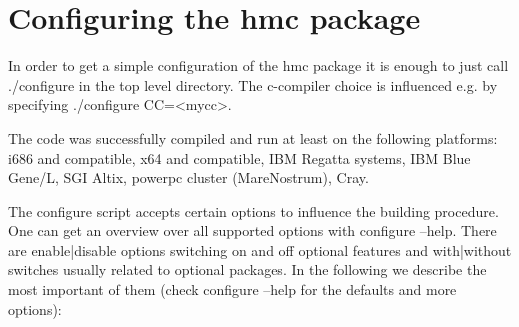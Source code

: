 \section{Configuring the hmc package}

In order to get a simple configuration of the hmc package it is enough
to just call {\ttfamily ./configure} in the top level directory. The
c-compiler choice is influenced e.g. by specifying {\ttfamily
  ./configure CC=<mycc>}. 

The code was successfully compiled and run at least on the following platforms:
i686 and compatible, x64 and compatible, IBM Regatta systems, IBM Blue
Gene/L, SGI Altix, powerpc cluster (MareNostrum), Cray.

The configure script accepts certain options to influence the building
procedure. One can get an overview over all supported options with
{\ttfamily configure --help}. There are {\ttfamily enable|disable}
options switching on and off optional features and {\ttfamily
  with|without} switches usually related to optional packages. In the
following we describe the most important of them (check {\ttfamily
  configure --help} for the defaults and more options):

